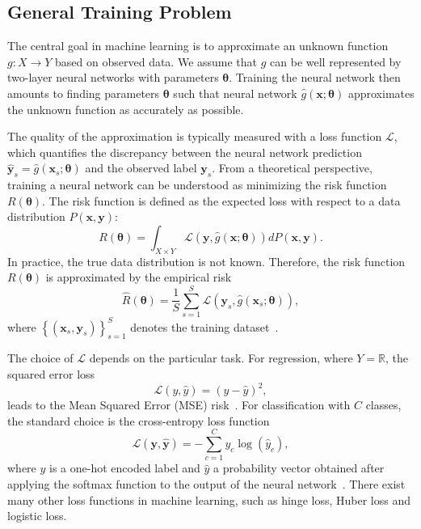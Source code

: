 \documentclass[a4paper, 11pt]{article}
\newcommand{\R}{\mathbb{R}}
\newcommand{\btheta}{\bm{\theta}}
\theoremstyle{plain} %
\begin{document}
	\subsection{General Training Problem}
	The central goal in machine learning is to approximate an unknown function $ g: X \to Y$ based on observed data. We assume that $ g $ can be well represented by two-layer neural networks with parameters $ \btheta $. Training the neural network then amounts to finding parameters $ \bm{\theta} $ such that neural network $ \hat{g}\left( \bm{x} ; \btheta \right)$ approximates the unknown function as accurately as possible. 
	
	The quality of the approximation is typically measured with a loss function $ \mathcal{L} $, which quantifies the discrepancy between the neural network prediction $ \hat{\bm{y}}_{s} = \hat{g}\left( \bm{x}_{s};\bm{\theta}\right)  $ and the observed label $ \bm{y}_{s} $. From a theoretical perspective, training a neural network can be understood as minimizing the risk function $ R(\btheta) $. The risk function is defined as the expected loss with respect to a data distribution $ P(\bm{x},\bm{y}) $:
	\begin{equation}
		R(\btheta) = \int_{X \times Y} \mathcal{L}(\bm{y}, \hat{g}(\bm{x};\btheta)) dP(\bm{x},\bm{y}).
	\end{equation}
	In practice, the true data distribution is not known. Therefore, the risk function $ R(\btheta) $ is approximated by the empirical risk
	\begin{equation}\label{eq:empirical_risk}
		\hat{R}\left( \bm{\theta} \right) = \frac{1}{S}\sum_{s=1}^{S}\mathcal{L}\left( \bm{y}_{s},\hat{g}(\bm{x}_{s};\btheta) \right),
	\end{equation}
	where $\left\{\left( \bm{x}_{s},\bm{y}_{s} \right)\right\}_{s=1}^{S}$ denotes the training dataset~\cite{vapnik1999}.

	The choice of $ \mathcal{L} $ depends on the particular task. For regression, where $ Y = \R $, the squared error loss
	\begin{equation}\label{eq:MSE}
		\mathcal{L}\left( y,\hat{y}\right) = \left( y - \hat{y} \right)^2,
	\end{equation}
	leads to the Mean Squared Error (MSE) risk~\cite{goodfellowDeepLearning2016}. For classification with $ C $ classes, the standard choice is the cross-entropy loss function
	\begin{equation}\label{eq:cross-entropy}
		\mathcal{L}\left( \bm{y},\hat{\bm{y}} \right) = - \sum_{c=1}^{C}y_{c}\log(\hat{y}_{c}),
	\end{equation}
	where $ y $ is a one-hot encoded label and $ \hat{y} $ a probability vector obtained after applying the softmax function to the output of the neural network~\cite{murphyMLProb2014}. There exist many other loss functions in machine learning, such as hinge loss, Huber loss and logistic loss.
	
\end{document}
